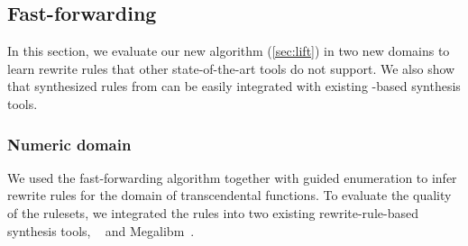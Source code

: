 \subsection{Fast-forwarding}
\label{subsec:eval-ff}

In this section,
  we evaluate our new \ff algorithm (\autoref{sec:lift})
  in two new domains to learn rewrite rules
  that other state-of-the-art tools
  do not support.
We also show that synthesized rules from \enumo
  can be easily integrated with
  existing \eqsat-based synthesis tools.

\begin{table}[h]
  \caption{
  Derivability comparison between rules from \enumo and \herbie.
  As in \autoref{table:oopsla},
    $R_1 ~ \rightarrow ~ R_2$ indicates using
    $R_1$ to derive $R_2$ rules.
  For Exponential and Trigonometric, we include the trusted arithmetic
    rules defined below (, and  without its division
    rules) when computing the derivability.
  We report both \lhs and \lhsandrhs derivability
    (in that order), separated by commas. The numbers in parentheses
    are times in seconds.
 ``-'' indicates that the derivability test
    could not be completed due to \herbie's
    unsound rules (\autoref{para:herbie}).
  We integrate these rules for
    end-to-end runs of \herbie~\citep{herbie} and
    Megalibm~\citep{megalibm} (\autoref{subsubsec:numbers}).}
\label{table:herbie}
\end{table}

\subsubsection{Numeric domain}
\label{subsubsec:numbers}

We used the fast-forwarding algorithm together with
  guided enumeration to infer rewrite rules
  for the domain of transcendental functions.
To evaluate the quality of the rulesets,
  we integrated the rules into two existing
  rewrite-rule-based synthesis tools,
  \herbie~\citep{herbie} and
  Megalibm~\citep{megalibm}.

